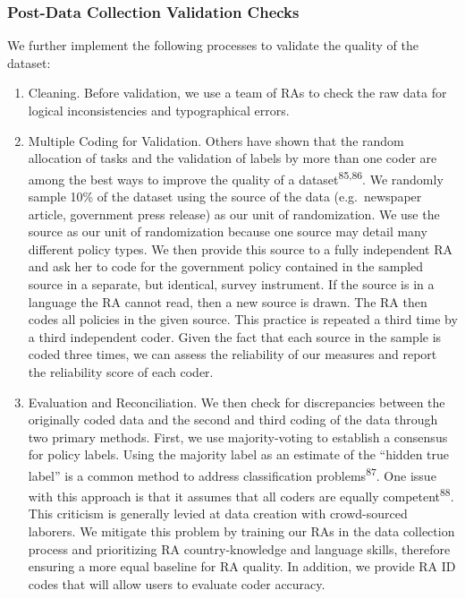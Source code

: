 \documentclass[]{article}
\begin{document}
\hypertarget{post-data-collection-validation-checks}{%
\subsubsection*{Post-Data Collection Validation Checks}\label{post-data-collection-validation-checks}}

We further implement the following processes to validate the quality of the dataset:

\begin{enumerate}
\def\labelenumi{\arabic{enumi}.}
\item
  Cleaning. Before validation, we use a team of RAs to check the raw data for logical inconsistencies and typographical errors.
\item
  Multiple Coding for Validation. Others have shown that the random allocation of tasks and the validation of labels by more than one coder are among the best ways to improve the quality of a dataset\textsuperscript{85,86}. We randomly sample 10\% of the dataset using the source of the data (e.g.~newspaper article, government press release) as our unit of randomization. We use the source as our unit of randomization because one source may detail many different policy types. We then provide this source to a fully independent RA and ask her to code for the government policy contained in the sampled source in a separate, but identical, survey instrument. If the source is in a language the RA cannot read, then a new source is drawn. The RA then codes all policies in the given source. This practice is repeated a third time by a third independent coder. Given the fact that each source in the sample is coded three times, we can assess the reliability of our measures and report the reliability score of each coder.
\item
  Evaluation and Reconciliation. We then check for discrepancies between the originally coded data and the second and third coding of the data through two primary methods. First, we use majority-voting to establish a consensus for policy labels. Using the majority label as an estimate of the ``hidden true label'' is a common method to address classification problems\textsuperscript{87}. One issue with this approach is that it assumes that all coders are equally competent\textsuperscript{88}. This criticism is generally levied at data creation with crowd-sourced laborers. We mitigate this problem by training our RAs in the data collection process and prioritizing RA country-knowledge and language skills, therefore ensuring a more equal baseline for RA quality. In addition, we provide RA ID codes that will allow users to evaluate coder accuracy.
\end{enumerate}
\end{document}
